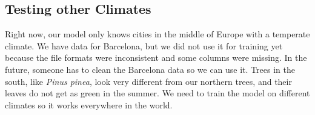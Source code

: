 \subsection{Testing other Climates}

Right now, our model only knows cities in the middle of Europe with a temperate climate. We have data for Barcelona, but we did not use it for training yet because the file formats were inconsistent and some columns were missing. In the future, someone has to clean the Barcelona data so we can use it. Trees in the south, like \textit{Pinus pinea}, look very different from our northern trees, and their leaves do not get as green in the summer. We need to train the model on different climates so it works everywhere in the world.
